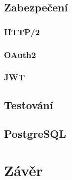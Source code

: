 \documentclass[a4paper,11pt,titlepage,fleqn]{article}
\begin{document}
    \subsection{Zabezpečení}
        \subsubsection{HTTP/2}
        \subsubsection{OAuth2}
        \subsubsection{JWT}

    \subsection{Testování}

    \subsection{PostgreSQL}

\newpage
\section{Závěr}

\newpage
\begin{thebibliography}{99}
\end{thebibliography}
\end{document}
